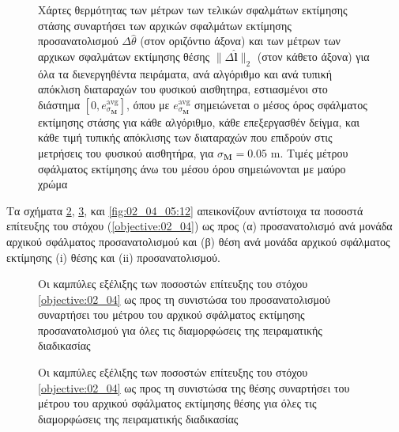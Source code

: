 \begin{figure}[!h]\vspace{1cm}\hspace{0.5cm}
  
  \vspace{1cm}
  \caption{\small Χάρτες θερμότητας των μέτρων των τελικών σφαλμάτων εκτίμησης
           στάσης συναρτήσει των αρχικών σφαλμάτων εκτίμησης προσανατολισμού
           $\Delta\hat{\theta}$ (στον οριζόντιο άξονα) και των μέτρων των
           αρχικων σφαλμάτων εκτίμησης θέσης $\|\Delta \hat{\bm{l}}\|_2$ (στον
           κάθετο άξονα) για όλα τα διενεργηθέντα πειράματα, ανά αλγόριθμο και
           ανά τυπική απόκλιση διαταραχών του φυσικού αισθητηρα, εστιασμένοι
           στο διάστημα $[0, e_{\sigma_{\bm{M}}}^{\text{avg}}]$, όπου με
           $e_{\sigma_{\bm{M}}}^{\text{avg}}$ σημειώνεται ο μέσος όρος
           σφάλματος εκτίμησης στάσης για κάθε αλγόριθμο, κάθε επεξεργασθέν
           δείγμα, και κάθε τιμή τυπικής απόκλισης των διαταραχών που επιδρούν
           στις μετρήσεις του φυσικού αισθητήρα, για $\sigma_{\bm{M}} = 0.05$
           m.  Τιμές μέτρου σφάλματος εκτίμησης άνω του μέσου όρου σημειώνονται
           με μαύρο χρώμα}
  \label{fig:02_04_05:09}
\end{figure}


Τα σχήματα \ref{fig:02_04_05:10}, \ref{fig:02_04_05:11}, και
\ref{fig:02_04_05:12} απεικονίζουν αντίστοιχα τα ποσοστά επίτευξης του στόχου
(\ref{objective:02_04}) ως προς (α) προσανατολισμό ανά μονάδα αρχικού σφάλματος
προσανατολισμού και (β) θέση ανά μονάδα αρχικού σφάλματος εκτίμησης (i) θέσης
και (ii) προσανατολισμού.

\begin{figure}[!h]\centering
  \vspace{2cm}
  
  \vspace{1.5cm}
  \caption{\small Οι καμπύλες εξέλιξης των ποσοστών επίτευξης του στόχου
           \ref{objective:02_04} ως προς τη συνιστώσα του προσανατολισμού
           συναρτήσει του μέτρου του αρχικού σφάλματος εκτίμησης
           προσανατολισμού για όλες τις διαμορφώσεις της πειραματικής
           διαδικασίας}
  \label{fig:02_04_05:10}
\end{figure}

\begin{figure}[!h]\centering
  \vspace{2cm}
  
  \vspace{1.5cm}
  \caption{\small Οι καμπύλες εξέλιξης των ποσοστών επίτευξης του στόχου
           \ref{objective:02_04} ως προς τη συνιστώσα της θέσης
           συναρτήσει του μέτρου του αρχικού σφάλματος εκτίμησης
           θέσης για όλες τις διαμορφώσεις της πειραματικής διαδικασίας}
  \label{fig:02_04_05:11}
\end{figure}


